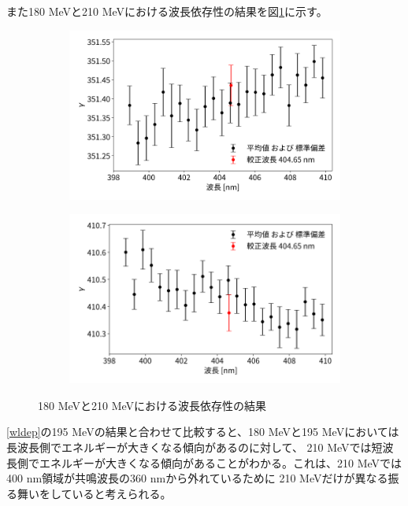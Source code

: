 \documentclass[a4paper,11pt,uplatex]{jsbook}
\begin{document}
また180 MeVと210 MeVにおける波長依存性の結果を図\ref{wldep_180210}に示す。
\begin{figure}
  \begin{subfigure}[h]{0.45\linewidth}
    \centering
    \includegraphics[width = \linewidth]{image/4-wldep180.png}
  \end{subfigure}
  \begin{subfigure}[h]{0.45\linewidth}
    \centering
    \includegraphics[width = \linewidth]{image/4-wldep210.png}
  \end{subfigure}
  \caption{180 MeVと210 MeVにおける波長依存性の結果}\label{wldep_180210}
\end{figure}
\ref{wldep}の195 MeVの結果と合わせて比較すると、180 MeVと195 MeVにおいては長波長側でエネルギーが大きくなる傾向があるのに対して、
210 MeVでは短波長側でエネルギーが大きくなる傾向があることがわかる。これは、210 MeVでは400 nm領域が共鳴波長の360 nmから外れているために
210 MeVだけが異なる振る舞いをしていると考えられる。
\end{document}

